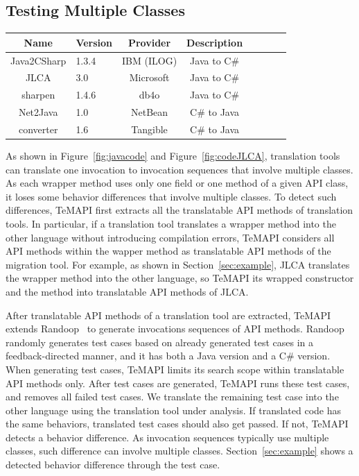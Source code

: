 \subsection{Testing Multiple Classes}
\label{sec:approach:sequence}
\begin{table}[t]
\centering
\begin{SmallOut}
\begin {tabular} {|c|l|c|c|c|c|c|c|}
 \hline
\textbf{Name}& \textbf{Version}& \textbf{Provider} &\textbf{Description}\\
\hline
Java2CSharp  &  1.3.4 & IBM (ILOG) & Java to C\# \\
\hline
JLCA         &  3.0   & Microsoft  & Java to C\# \\
\hline
sharpen      &  1.4.6 & db4o       & Java to C\# \\
\hline
Net2Java     &  1.0   & NetBean    &  C\# to Java\\
\hline
converter    &  1.6   & Tangible   &  C\# to Java\\
\hline
\end{tabular}\vspace*{-2ex}
 \label{table:subjects}
\end{SmallOut}\vspace*{-4ex}
\end{table}
As shown in Figure~\ref{fig:javacode} and Figure~\ref{fig:codeJLCA}, translation tools can translate one invocation to invocation sequences that involve multiple classes. As each wrapper method uses only one field or one method of a given API class, it loses some behavior differences that involve multiple classes. To detect such differences, TeMAPI first extracts all the translatable API methods of translation tools. In particular, if a translation tool translates a wrapper method into the other language without introducing compilation errors, TeMAPI considers all API methods within the wapper method as translatable API methods of the migration tool. For example, as shown in Section~\ref{sec:example}, JLCA translates the  wrapper method into the other language, so TeMAPI its wrapped  constructor and the  method into translatable API methods of JLCA.

After translatable API methods of a translation tool are extracted, TeMAPI extends Randoop~\cite{pacheco2007feedback} to generate invocations sequences of API methods. Randoop randomly generates test cases based on already generated test cases in a feedback-directed manner, and it has both a Java version and a C\# version. When generating test cases, TeMAPI limits its search scope within translatable API methods only. After test cases are generated, TeMAPI runs these test cases, and removes all failed test cases. We translate the remaining test case into the other language using the translation tool under analysis. If translated code has the same behaviors, translated test cases should also get passed. If not, TeMAPI detects a behavior difference. As invocation sequences typically use multiple classes, such difference can involve multiple classes. Section~\ref{sec:example} shows a detected behavior difference through the  test case.



